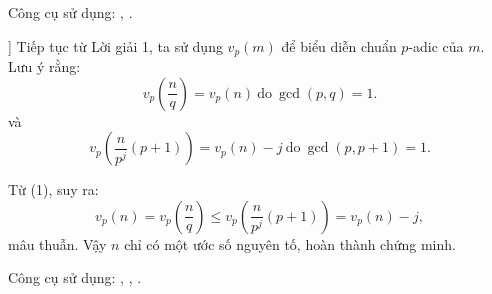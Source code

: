 \documentclass[../../divisors.tex]{subfiles}
\begin{document}
\begin{remark*}
    Công cụ sử dụng: , .
\end{remark*}

\begin{soln}[4\footnotemark[\value{footnote}]]
    Tiếp tục từ Lời giải 1, ta sử dụng \( v_p(m) \) để biểu diễn chuẩn \( p \)-adic của \( m \). Lưu ý rằng:
    \[
        v_p \left( \frac{n}{q} \right) = v_p(n)\ \text{do}\ \gcd(p,q) = 1.
    \]
    và
    \[
        v_p \left( \frac{n}{p^j} (p+1) \right) = v_p(n) - j \ \text{do}\ \gcd(p,p+1) = 1.
    \]

    Từ (1), suy ra:
    \[
        v_p(n) = v_p \left( \frac{n}{q} \right) \leq v_p \left( \frac{n}{p^j} (p+1) \right) = v_p(n) - j,
    \]
    mâu thuẫn. Vậy \( n \) chỉ có một ước số nguyên tố, hoàn thành chứng minh.
\end{soln}

\begin{remark*}
    Công cụ sử dụng: , , .
\end{remark*}

    
\end{document}
